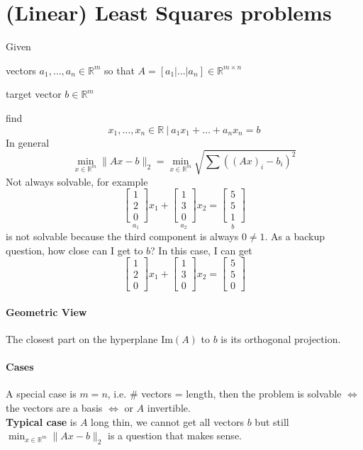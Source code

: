 \documentclass[10pt]{report}
\begin{document}
\section{(Linear) Least Squares problems}
Given 
\begin{list}{}{}
	\item vectors $a_1,\ldots,a_n\in \mathbb{R}^m$ so that $A = [a_1|\ldots|a_n]\in \mathbb{R}^{m\times n}$
	\item target vector $b\in \mathbb{R}^m$
\end{list}
find $$x_1,\ldots,x_n\in \mathbb{R}\:|\: a_1x_1 + \ldots + a_n x_n = b$$
In general $$\min_{x\in \mathbb{R}^m} \|Ax - b\|_2 = \min_{x\in \mathbb{R}^m} \sqrt{\sum \left((Ax)_i - b_i\right)^2}$$
Not always solvable, for example $$\underset{a_1}{\left[\begin{array}{c}
1\\2\\0
\end{array}\right]}x_1 + \underset{a_2}{\left[\begin{array}{c}
1\\3\\0
\end{array}\right]}x_2 = \underset{b}{\left[\begin{array}{c}
5\\5\\1
\end{array}\right]}$$ is not solvable because the third component is always $0 \neq 1$. As a backup question, how close can I get to $b$? In this case, I can get $$\left[\begin{array}{c}
1\\2\\0
\end{array}\right]x_1 + \left[\begin{array}{c}
1\\3\\0
\end{array}\right]x_2 = \left[\begin{array}{c}
5\\5\\0
\end{array}\right]$$
\paragraph{Geometric View} The closest part on the hyperplane $\text{Im}(A)$ to $b$ is its orthogonal projection.
\paragraph{Cases} A special case is $m=n$, i.e. \# vectors = length, then the problem is solvable $\Leftrightarrow$ the vectors are a basis $\Leftrightarrow$ or $A$ invertible.\\
\textbf{Typical case} is $A$ long thin, we cannot get all vectors $b$ but still $\min_{x\in \mathbb{R}^m} \|Ax - b\|_2$ is a question that makes sense. 
\end{document}
